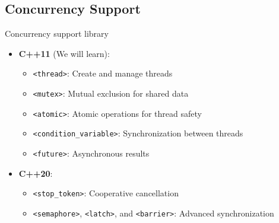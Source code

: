 \subsection{Concurrency Support}
\begin{frame}[fragile]{Concurrency support library}
    \begin{itemize}
        \item \textbf{C++11} (We will learn):
              \begin{itemize}
                  \item \texttt{<thread>}: Create and manage threads
                  \item \texttt{<mutex>}: Mutual exclusion for shared data
                  \item \texttt{<atomic>}: Atomic operations for thread safety
                  \item \texttt{<condition\_variable>}: Synchronization between threads
                  \item \texttt{<future>}: Asynchronous results
              \end{itemize}
        \item \textbf{C++20}:
              \begin{itemize}
                  \item \texttt{<stop\_token>}: Cooperative cancellation
                  \item \texttt{<semaphore>}, \texttt{<latch>}, and \texttt{<barrier>}: Advanced synchronization
              \end{itemize}
    \end{itemize}
\end{frame}
